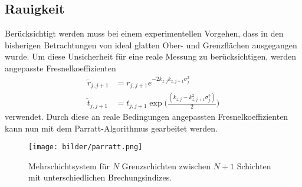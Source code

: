 \subsection{Rauigkeit}
Berücksichtigt werden muss bei einem experimentellen Vorgehen, dass in den bisherigen Betrachtungen von ideal glatten Ober- und Grenzflächen ausgegangen wurde. Um diese Unsicherheit für eine reale Messung zu berücksichtigen, werden angepasste Fresnelkoeffizienten
\begin{align}
  \tilde{r}_{j,j+1}&=r_{j,j+1}e^{-2k_{z,j}k_{z,j+1}\sigma_j^2}\\
  \tilde{t}_{j,j+1}&=t_{j,j+1}\exp\biggl(\frac{(k_{z,j}-k_{z,j+1}^2\sigma_j^2)}{2}\biggr)
\end{align}
verwendet. Durch diese an reale Bedingungen angepassten Fresnelkoeffizienten kann nun mit dem Parratt-Algorithmus gearbeitet werden.
\begin{figure}[H]
  \centering
  \texttt{[image: bilder/parratt.png]}
  \caption{Mehrschichtsystem für $N$ Grenzschichten zwischen $N+1$ Schichten mit unterschiedlichen Brechungsindizes\cite{anleitung}.}
  \label{parratt}
\end{figure}

